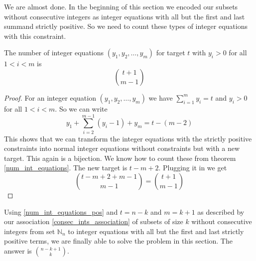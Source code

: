 We are almost done. In the beginning of this section we encoded our subsets without consecutive integers as integer equations with all but the first and last summand strictly positive. So we need to count these types of integer equations with this constraint.

\begin{thm}\label{num_int_equations_pos}
The number of integer equations $(y_1, y_2, \ldots, y_m)$ for target $t$ with $y_i > 0$ for all $1 < i < m$ is 
$$
\binom{t + 1}{m - 1}
$$
\end{thm}

\begin{proof}
For an integer equation $(y_1, y_2, \ldots, y_m)$ we have $\sum_{i = 1}^m y_i = t$ and $y_i > 0$ for all $1 < i < m$. So we can write
$$
y_1 + \sum_{i = 2}^{m-1} (y_i - 1) + y_m = t - (m - 2)
$$
This shows that we can transform the integer equations with the strictly positive constraints into normal integer equations without constraints but with a new target. This again is a bijection. We know how to count these from theorem \ref{num_int_equations}. The new target is $t - m + 2$. Plugging it in we get 
$$
\binom{t - m + 2 + m - 1}{m - 1} = \binom{t + 1}{m - 1}
$$
\end{proof}

Using \ref{num_int_equations_pos} and $t = n - k$ and $m = k + 1$ as described by our association \ref{consec_ints_association} of subsets of size $k$ without consecutive integers from set $\mathbb{N}_n$ to integer equations with all but the first and last strictly positive terms, we are finally able to solve the problem in this section. The answer is $\binom{n - k + 1}{k}$.
